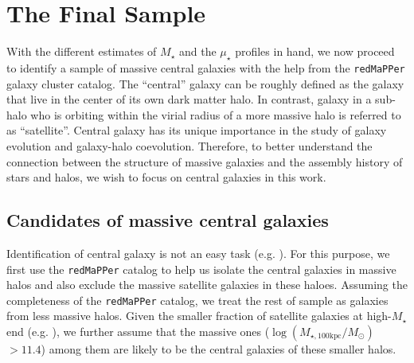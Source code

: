 \documentclass[a4paper,fleqn,usenatbib]{mnras}
\def\redm{\texttt{redMaPPer}}
\def\rbcg{\texttt{cenHighMh}}
\def\nbcg{\texttt{cenLowMh}}
\def\mstar{{$M_{\star}$}}
\def\logmtot{{$\log (M_{\star,100\mathrm{kpc}}/M_{\odot})$}}
\def\mden{{$\mu_{\star}$}}
\begin{document}
    

\section{The Final Sample}
    \label{sec:final}
    
	With the different estimates of \mstar{} and the \mden{} profiles in hand, we now 
	proceed to identify a sample of massive central galaxies with the help from the 
	\redm{} galaxy cluster catalog. 
	The ``central'' galaxy can be roughly defined as the galaxy that live in the 
	center of its own dark matter halo.  
	In contrast, galaxy in a sub-halo who is orbiting within the virial radius of a 
	more massive halo is referred to as ``satellite''. 
	Central galaxy has its unique importance in the study of galaxy evolution and 
	galaxy-halo coevolution.
	Therefore, to better understand the connection between the structure of massive 
	galaxies and the assembly history of stars and halos, we wish to focus on central 
	galaxies in this work. 
    
\subsection{Candidates of massive central galaxies}
    \label{ssec:redmapper}
    
    Identification of central galaxy is not an easy task (e.g. \citealt{Yang2007}).
    For this purpose, we first use the \redm{} catalog to help us isolate the central 
    galaxies in massive halos and also exclude the massive satellite galaxies in these
    haloes.  
    Assuming the completeness of the \redm{} catalog, we treat the rest of sample as 
    galaxies from less massive halos.  
    Given the smaller fraction of satellite galaxies at high-\mstar{} end (e.g. 
    \citealt{Reid2014, Hoshino2015, Saito2016}), 
    we further assume that the massive ones (\logmtot{}$>11.4$) among them are likely 
    to be the central galaxies of these smaller halos. 
    
\end{document}
